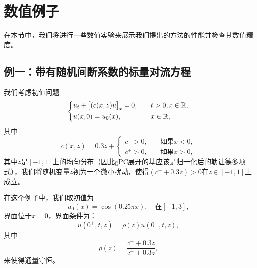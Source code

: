 \section{数值例子}\label{c2-4}

在本节中，我们将进行一些数值实验来展示我们提出的方法的性能并检查其数值精度。

\subsection{例一：带有随机间断系数的标量对流方程}
我们考虑初值问题
\begin{equation}
  \left\{
  \begin{aligned}
    &u_t + \big[(c(x,z)u\big]_x=0, &\quad& t>0, x\in{\mathbb{R}}, \\
    &u(x,0) = u_0(x), &&x\in{\mathbb{R}},
  \end{aligned}
  \right.
\end{equation}
其中
\begin{equation}
    c(x,z) = 0.3z + 
    \begin{cases}
        c^- > 0, \quad &\text{如果$x < 0$},\\
        c^+ > 0, \quad &\text{如果$x > 0$},
    \end{cases}
\end{equation}
其中$z$是$[-1,1]$上的均匀分布（因此gPC展开的基应该是归一化后的勒让德多项式），我们将随机变量$z$视为一个微小扰动，使得$(c^{\pm} + 0.3z) > 0$在$z\in[-1,1]$上成立。

在这个例子中，我们取初值为
\begin{equation}
  u_0(x) = \cos (0.25\pi x), \quad \text{在$[-1,3]$},
\end{equation}
界面位于$x=0$，界面条件为：
\begin{equation}
  u(0^+, t, z) = \rho(z) u(0^-, t, z),
\end{equation}
其中
\begin{equation}
  \rho(z) = \frac{c^- + 0.3z}{c^+ + 0.3z},
\end{equation}
来使得通量守恒。

